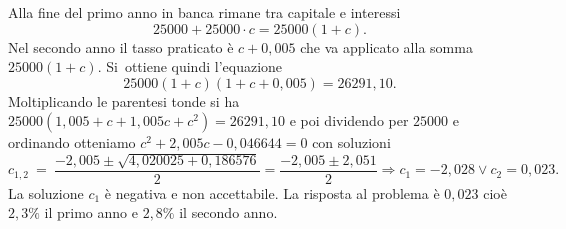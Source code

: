 \begin{soluzione}
Alla fine del primo anno in banca rimane tra capitale e interessi \[25000 +
25000 \cdot c = 25000 ( 1 +c ).\] Nel secondo anno il tasso praticato è 
\(c+0,005\) che va applicato alla somma \(25000(1+c)\). Si~ottiene quindi 
l'equazione \[25000 ( 1 +c ) ( 1 +c +0,005 ) = 26291,10.\]
Moltiplicando le parentesi tonde si ha \(25000 ( 1,005 +c +1,005 c +c^{2} ) 
= 
26291,10\) e poi dividendo per \(25000\) e ordinando otteniamo
\(c^{2} +2,005 c -0,046644=0\) con soluzioni
\[c_{1,2}~=~\dfrac{-2,005 \pm \sqrt{4,020025 +0,186576}}{2} = \dfrac{-2,005 
\pm 2,051}{2}\Rightarrow c_{1} = -2,028 \vee c_{2} = 0,023.\]
La soluzione \(c_1\) è negativa e non accettabile. La risposta al problema è 
\(0,023\) cioè \(2,3\%\) il primo anno e \(2,8\%\) il secondo anno.
\end{soluzione}
% 
% 
% 
